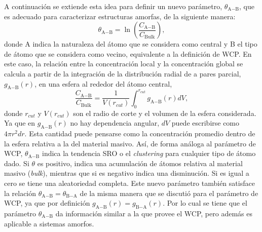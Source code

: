 A continuación se extiende esta idea para definir un nuevo parámetro, 
$\theta_{\text{A}-\text{B}}$, que es adecuado para caracterizar estructuras amorfas, de la 
siguiente manera:
\begin{equation}
    \theta_{\text{A}-\text{B}} = \ln \left( \frac{C_{\text{A}-\text{B}}}{C_{\text{Bulk}}} \right),
\end{equation}
donde A indica la naturaleza del átomo que se considera como central y B el tipo
de átomo que se considera como vecino, equivalente a la definición de WCP. En
este caso, la relación entre la concentración local y la concentración global se 
calcula a partir de la integración de la distribución radial de a pares parcial,
$g_{\text{A}-\text{B}}(r)$, en una esfera al rededor del átomo central,
\begin{equation}
    \frac{C_{\text{A}-\text{B}}}{C_{\text{Bulk}}} = \frac{1}{V(r_{cut})} \int_0^{r_{cut}} g_{\text{A}-\text{B}}(r) dV,
\end{equation}
donde $r_{cut}$ y $V(r_{cut})$ son el radio de corte y el volumen de la esfera 
considerada. Ya que en $g_{\text{A}-\text{B}}(r)$ no hay dependencia angular, $dV$ puede 
escribirse como $4 \pi r^2 dr$. Esta cantidad puede pensarse como la 
concentración promedio dentro de la esfera relativa a la del material 
masivo. Así, de forma análoga al parámetro de WCP, $\theta_{\text{A}-\text{B}}$ indica 
la tendencia SRO o el \textit{clustering} para cualquier tipo de átomo dado.
Si $\theta$ es positivo, indica una acumulación de átomos relativa al material masivo
(\textit{bulk}), mientras que si es negativo indica una disminución. Si es igual a 
cero se tiene una aleatoriedad completa. Este nuevo parámetro también satisface 
la relación $\theta_{\text{A}-\text{B}} = \theta_{\text{B}-\text{A}}$ de la misma manera que se discutió para
el parámetro de WCP, ya que por definición $g_{\text{A}-\text{B}}(r) = g_{\text{B}-\text{A}}(r)$. Por lo cual 
se tiene que el parámetro $\theta_{\text{A}-\text{B}}$ da información similar a la que provee 
el WCP, pero además es aplicable a sistemas amorfos.

